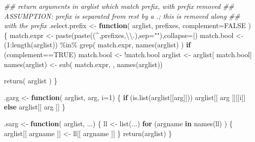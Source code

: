 \documentclass[
  letterpaper,
  DIV=11,
  numbers=noendperiod]{scrartcl}
\newenvironment{Shaded}{\begin{snugshade}}{\end{snugshade}}
\newcommand{\AttributeTok}[1]{\textcolor[rgb]{0.40,0.45,0.13}{#1}}
\newcommand{\ConstantTok}[1]{\textcolor[rgb]{0.56,0.35,0.01}{#1}}
\newcommand{\ControlFlowTok}[1]{\textcolor[rgb]{0.00,0.23,0.31}{\textbf{#1}}}
\newcommand{\DecValTok}[1]{\textcolor[rgb]{0.68,0.00,0.00}{#1}}
\newcommand{\DocumentationTok}[1]{\textcolor[rgb]{0.37,0.37,0.37}{\textit{#1}}}
\newcommand{\FunctionTok}[1]{\textcolor[rgb]{0.28,0.35,0.67}{#1}}
\newcommand{\NormalTok}[1]{\textcolor[rgb]{0.00,0.23,0.31}{#1}}
\newcommand{\OtherTok}[1]{\textcolor[rgb]{0.00,0.23,0.31}{#1}}
\newcommand{\SpecialCharTok}[1]{\textcolor[rgb]{0.37,0.37,0.37}{#1}}
\newcommand{\StringTok}[1]{\textcolor[rgb]{0.13,0.47,0.30}{#1}}
\begin{document}
\begin{Shaded}
\begin{Highlighting}[]
\DocumentationTok{\#\# return arguments in arglist which match prefix, with prefix removed}
\DocumentationTok{\#\# ASSUMPTION: prefix is separated from rest by a \textquotesingle{}.\textquotesingle{}; this is removed along}
\DocumentationTok{\#\# with the prefix}
\NormalTok{.select.prefix }\OtherTok{\textless{}{-}} \ControlFlowTok{function}\NormalTok{( arglist, prefixes, }\AttributeTok{complement=}\ConstantTok{FALSE}\NormalTok{ ) \{}
\NormalTok{    match.expr }\OtherTok{\textless{}{-}} \FunctionTok{paste}\NormalTok{(}\FunctionTok{paste}\NormalTok{(}\StringTok{\textquotesingle{}(\^{}\textquotesingle{}}\NormalTok{,prefixes,}\StringTok{\textquotesingle{}}\SpecialCharTok{\textbackslash{}\textbackslash{}}\StringTok{.)\textquotesingle{}}\NormalTok{,}\AttributeTok{sep=}\StringTok{""}\NormalTok{),}\AttributeTok{collapse=}\StringTok{\textquotesingle{}|\textquotesingle{}}\NormalTok{)}
\NormalTok{    match.bool }\OtherTok{\textless{}{-}}\NormalTok{ (}\DecValTok{1}\SpecialCharTok{:}\FunctionTok{length}\NormalTok{(arglist)) }\SpecialCharTok{\%in\%} \FunctionTok{grep}\NormalTok{( match.expr, }\FunctionTok{names}\NormalTok{(arglist) )}
    \ControlFlowTok{if}\NormalTok{ (complement}\SpecialCharTok{==}\ConstantTok{TRUE}\NormalTok{) match.bool }\OtherTok{\textless{}{-}} \SpecialCharTok{!}\NormalTok{match.bool}
\NormalTok{    arglist }\OtherTok{\textless{}{-}}\NormalTok{ arglist[ match.bool]}
    \FunctionTok{names}\NormalTok{(arglist) }\OtherTok{\textless{}{-}} \FunctionTok{sub}\NormalTok{( match.expr, }\StringTok{\textquotesingle{}\textquotesingle{}}\NormalTok{, }\FunctionTok{names}\NormalTok{(arglist))}
    
    \FunctionTok{return}\NormalTok{( arglist )}
\NormalTok{\}}

\NormalTok{.garg }\OtherTok{\textless{}{-}} \ControlFlowTok{function}\NormalTok{( arglist, arg, }\AttributeTok{i=}\DecValTok{1}\NormalTok{) \{}
    \ControlFlowTok{if}\NormalTok{ (}\FunctionTok{is.list}\NormalTok{(arglist[[arg]])) arglist[[ arg ]][[i]]}
    \ControlFlowTok{else}\NormalTok{ arglist[[ arg ]]}
\NormalTok{\}}

\NormalTok{.sarg }\OtherTok{\textless{}{-}} \ControlFlowTok{function}\NormalTok{( arglist, ...) \{}
\NormalTok{    ll }\OtherTok{\textless{}{-}} \FunctionTok{list}\NormalTok{(...)}
    \ControlFlowTok{for}\NormalTok{ (argname }\ControlFlowTok{in} \FunctionTok{names}\NormalTok{(ll) ) \{}
\NormalTok{        arglist[[ argname ]] }\OtherTok{\textless{}{-}}\NormalTok{ ll[[ argname ]]}
\NormalTok{    \}}
    \FunctionTok{return}\NormalTok{(arglist)}
\NormalTok{\}}


\end{Highlighting}
\end{Shaded}
\end{document}

